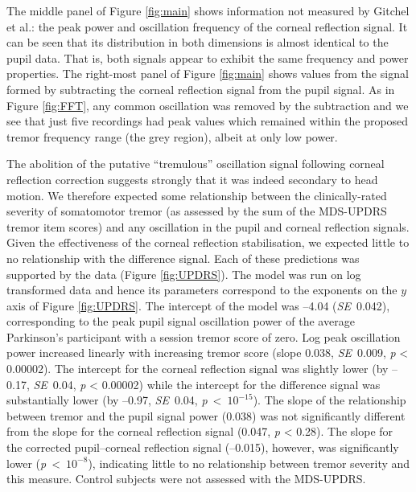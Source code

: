 \documentclass[jou,a4paper]{apa6}
\begin{document}
The middle panel of Figure \ref{fig:main} shows information not measured by Gitchel et al.: the peak power and oscillation frequency of the corneal reflection signal. It can be seen that its distribution in both dimensions is almost identical to the pupil data. That is, both signals appear to exhibit the same frequency and power properties. The right-most panel of Figure \ref{fig:main} shows values from the signal formed by subtracting the corneal reflection signal from the pupil signal. As in Figure \ref{fig:FFT}, any common oscillation was removed by the subtraction and we see that just five recordings had peak values which remained within the proposed tremor frequency range (the grey region), albeit at only low power.

The abolition of the putative ``tremulous'' oscillation signal following corneal reflection correction suggests strongly that it was indeed secondary to head motion. We therefore expected some relationship between the clinically-rated severity of somatomotor tremor (as assessed by the sum of the MDS-UPDRS tremor item scores) and any oscillation in the pupil and corneal reflection signals. Given the effectiveness of the corneal reflection stabilisation, we expected little to no relationship with the difference signal. Each of these predictions was supported by the data (Figure \ref{fig:UPDRS}). The model was run on log transformed data and hence its parameters correspond to the exponents on the $y$ axis of Figure \ref{fig:UPDRS}. The intercept of the model was --4.04 (\textit{SE}~0.042), corresponding to the peak pupil signal oscillation power of the average Parkinson's participant with a session tremor score of zero. Log peak oscillation power increased linearly with increasing tremor score (slope 0.038, \textit{SE}~0.009, \textit{p} < 0.00002). The intercept for the corneal reflection signal was slightly lower (by --0.17, \textit{SE}~0.04, \textit{p} < 0.00002) while the intercept for the difference signal was substantially lower (by --0.97, \textit{SE}~0.04, \textit{p}~<~$10^{-15}$). The slope of the relationship between tremor and the pupil signal power (0.038) was not significantly different from  the slope for the corneal reflection signal (0.047, \textit{p} < 0.28). The slope for the corrected pupil--corneal reflection signal (--0.015), however, was significantly lower (\textit{p}~<~$10^{-8}$), indicating little to no relationship between tremor severity and this measure. Control subjects were not assessed with the MDS-UPDRS.
\end{document}
